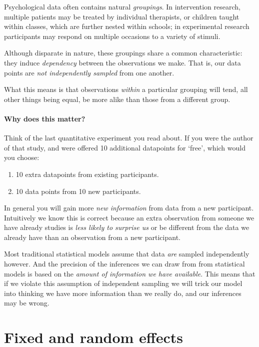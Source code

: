 \documentclass[]{article}
\providecommand{\tightlist}{%
  \setlength{\itemsep}{0pt}\setlength{\parskip}{0pt}}
\let\oldparagraph\paragraph
\renewcommand{\paragraph}[1]{\oldparagraph{#1}\mbox{}}
\theoremstyle{definition}
\theoremstyle{definition}
\theoremstyle{definition}
\theoremstyle{remark}
\begin{document}
Psychological data often contains natural \emph{groupings}. In
intervention research, multiple patients may be treated by individual
therapists, or children taught within classes, which are further nested
within schools; in experimental research participants may respond on
multiple occasions to a variety of stimuli.

Although disparate in nature, these groupings share a common
characteristic: they induce \emph{dependency} between the observations
we make. That is, our data points are \emph{not independently sampled}
from one another.

What this means is that observations \emph{within} a particular grouping
will tend, all other things being equal, be more alike than those from a
different group.

\paragraph{Why does this matter?}\label{why-does-this-matter}

Think of the last quantitative experiment you read about. If you were
the author of that study, and were offered 10 additional datapoints for
`free', which would you choose:

\begin{enumerate}
\def\labelenumi{\arabic{enumi}.}
\tightlist
\item
  10 extra datapoints from existing participants.
\item
  10 data points from 10 new participants.
\end{enumerate}

In general you will gain more \emph{new information} from data from a
new participant. Intuitively we know this is correct because an extra
observation from someone we have already studies is \emph{less likely to
surprise us} or be different from the data we already have than an
observation from a new participant.

Most traditional statistical models assume that data \emph{are} sampled
independently however. And the precision of the inferences we can draw
from from statistical models is based on the \emph{amount of information
we have available}. This means that if we violate this assumption of
independent sampling we will trick our model into thinking we have more
information than we really do, and our inferences may be wrong.

\hypertarget{fixed-or-random}{\section{Fixed and random
effects}\label{fixed-or-random}}
\end{document}
